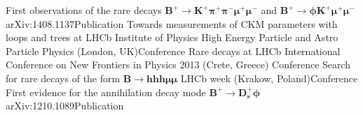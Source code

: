 {First observations of the rare decays
  $\boldsymbol{B^+\!\to K^+\pi^+\pi^-\mu^+\mu^-}$ and
  $\boldsymbol{B^+\!\to\phi K^+\mu^+\mu^-}$}
  {arXiv:1408.1137}{Publication}
{Towards measurements of CKM parameters with loops and trees at LHCb}
{Institute of Physics High Energy Particle and Astro Particle
Physics (London, UK)}{Conference}
{Rare decays at LHCb}
{International Conference on New Frontiers in Physics 2013 (Crete, Greece)}
{Conference}
{Search for rare decays of the form $\boldsymbol{B\to hhh\mu\mu}$}
{LHCb week (Krakow, Poland)}{Conference}
{First evidence for the annihilation decay mode $\boldsymbol{B^+\!\to D_s^+\phi}$}
{arXiv:1210.1089}{Publication}







